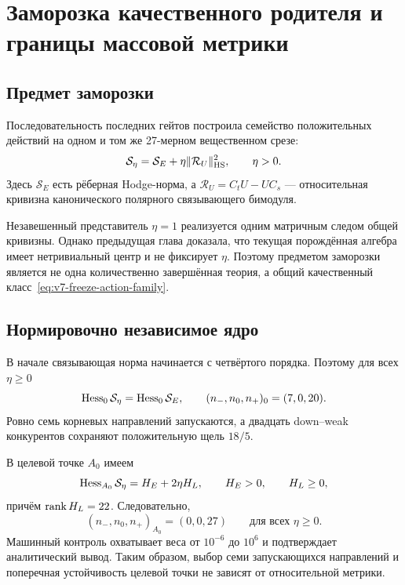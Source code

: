 \chapter{Заморозка качественного родителя и границы массовой метрики}
\label{ch:v7-qualitative-parent-mass-metric-freeze-gate}

\section{Предмет заморозки}

Последовательность последних гейтов построила семейство положительных
действий на одном и том же 27-мерном вещественном срезе:
\begin{equation}
 \mathcal S_\eta=\mathcal S_E+\eta\|\mathcal R_U\|_{\rm HS}^2,
 \qquad \eta>0.
 \label{eq:v7-freeze-action-family}
\end{equation}
Здесь $\mathcal S_E$ есть рёберная Hodge-норма, а
$\mathcal R_U=C_tU-UC_s$ --- относительная кривизна канонического
полярного связывающего бимодуля.

Незавешенный представитель $\eta=1$ реализуется одним матричным следом
общей кривизны. Однако предыдущая глава доказала, что текущая порождённая
алгебра имеет нетривиальный центр и не фиксирует $\eta$. Поэтому предметом
заморозки является не одна количественно завершённая теория, а общий
качественный класс~\eqref{eq:v7-freeze-action-family}.

\section{Нормировочно независимое ядро}

В начале связывающая норма начинается с четвёртого порядка. Поэтому для
всех $\eta\geq0$
\begin{equation}
 \operatorname{Hess}_0\mathcal S_\eta=\operatorname{Hess}_0\mathcal S_E,
 \qquad
 (n_-,n_0,n_+)_0=(7,0,20).
 \label{eq:v7-freeze-origin-signature}
\end{equation}
Ровно семь корневых направлений запускаются, а двадцать down--weak
конкурентов сохраняют положительную щель $18/5$.

В целевой точке $A_0$ имеем
\begin{equation}
 \operatorname{Hess}_{A_0}\mathcal S_\eta
 =H_E+2\eta H_L,
 \qquad H_E>0,
 \qquad H_L\geq0,
 \label{eq:v7-freeze-vacuum-decomposition}
\end{equation}
причём $\operatorname{rank} H_L=22$. Следовательно,
\begin{equation}
 (n_-,n_0,n_+)_{A_0}=(0,0,27)
 \qquad\text{для всех }\eta\geq0.
 \label{eq:v7-freeze-vacuum-signature}
\end{equation}
Машинный контроль охватывает веса от $10^{-6}$ до $10^6$ и подтверждает
аналитический вывод. Таким образом, выбор семи запускающихся направлений и
поперечная устойчивость целевой точки не зависят от относительной метрики.

